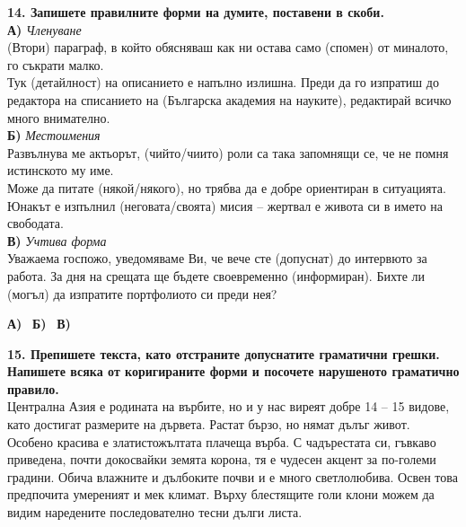 \documentclass[12pt,a4paper]{article}
\begin{document}
\noindent
\textbf{14. Запишете правилните форми на думите, поставени в скоби.} \\
\textbf{А)} \textit{Членуване} \\
(Втори) параграф, в който обясняваш как ни остава само (спомен) от миналото, го съкрати малко. \\
Тук (детайлност) на описанието е напълно излишна. Преди да го изпратиш до редактора на списанието на (Българска академия на науките), редактирай всичко много внимателно. \\
\textbf{Б)} \textit{Местоимения} \\
Развълнува ме актьорът, (чийто/чиито) роли са така запомнящи се, че не помня истинското му име. \\
Може да питате (някой/някого), но трябва да е добре ориентиран в ситуацията. \\
Юнакът е изпълнил (неговата/своята) мисия – жертвал е живота си в името на свободата. \\
\textbf{В)} \textit{Учтива форма} \\
Уважаема госпожо, уведомяваме Ви, че вече сте (допуснат) до интервюто за работа. За дня на срещата ще бъдете своевременно (информиран). Бихте ли (могъл) да изпратите портфолиото си преди нея?
\begin{flushleft}
\textbf{А)} \dotfill \
\textbf{Б)} \dotfill \
\textbf{В)} \dotfill
\end{flushleft}

\vspace{0.3cm}

\noindent
\textbf{15. Препишете текста, като отстраните допуснатите граматични грешки. Напишете всяка от коригираните форми и посочете нарушеното граматично правило.} \\
Централна Азия е родината на върбите, но и у нас виреят добре 14 – 15 видове, като достигат размерите на дървета. Растат бързо, но нямат дълъг живот. Особено красива е златистожълтата плачеща върба. С чадърестата си, гъвкаво приведена, почти докосвайки земята корона, тя е чудесен акцент за по-големи градини. Обича влажните и дълбоките почви и е много светлолюбива. Освен това предпочита умереният и мек климат. Върху блестящите голи клони можем да видим наредените последователно тесни дълги листа.
\end{document}
